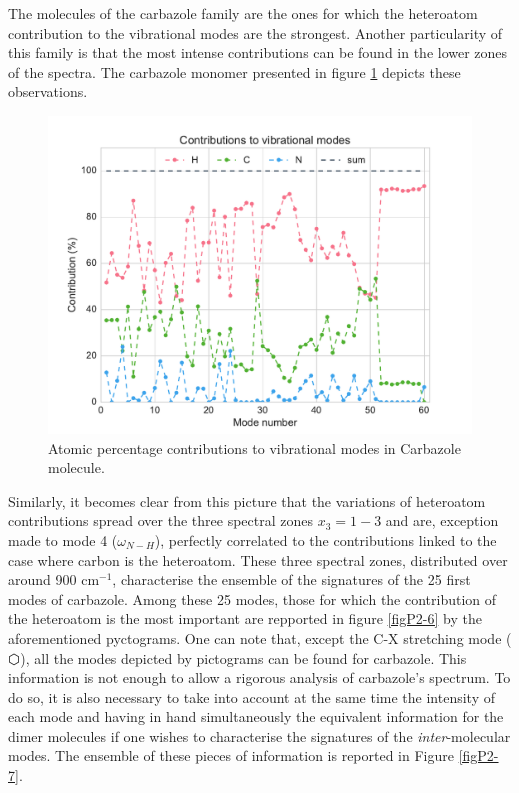 The molecules of the carbazole family are the ones for which the heteroatom contribution to the vibrational modes are the strongest. Another particularity of this family is that the most intense contributions can be found in the lower zones of the spectra. The carbazole monomer presented in figure \ref{figP2-5} depicts these observations. 

 \begin{figure}[H]
 	\begin{center}
 		\includegraphics[scale=0.8]{image/P2-5}
 	\end{center}
 	\caption{Atomic percentage contributions to vibrational modes in Carbazole molecule.} \label{figP2-5}
 \end{figure}
	
	
	

	
	Similarly, it becomes clear from this picture that the variations of heteroatom contributions spread over the three spectral zones $x_3=1-3$ and are, exception made to mode 4 ($\omega_{N-H}$), perfectly correlated to the contributions linked to the case where carbon is the heteroatom. These three spectral zones, distributed over around 900 cm$^{-1}$, characterise the ensemble of the signatures of the 25 first modes of carbazole. Among these 25 modes, those for which the contribution of the heteroatom is the most important are repported in figure \ref{figP2-6} by the aforementioned pyctograms. One can note that, except the C-X stretching mode ($\varhexagon$), all the modes depicted by pictograms can be found for carbazole. This information is not enough to allow a rigorous analysis of carbazole’s spectrum. To do so, it is also necessary to take into account at the same time the intensity of each mode and having in hand simultaneously the equivalent information for the dimer molecules if one wishes to characterise the signatures of the \textit{inter}-molecular modes. The ensemble of these pieces of information is reported in Figure \ref{figP2-7}.
	 
